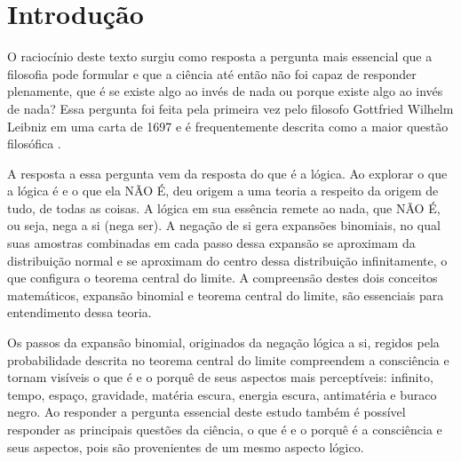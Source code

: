 \section*{Introdução}

O raciocínio deste texto surgiu como resposta a pergunta mais essencial que a filosofia pode formular e que a ciência até então não foi capaz de responder plenamente, que é se existe algo ao invés de nada ou porque existe algo ao invés de nada? 
Essa pergunta foi feita pela primeira vez pelo filosofo Gottfried Wilhelm Leibniz em uma carta de 1697 e é frequentemente descrita como a maior questão filosófica \cite{ leibnizbrasil_origem_das_coisas}.

A resposta a essa pergunta vem da resposta do que é a lógica. Ao explorar o que a lógica é e o que ela NÃO É, deu origem a uma teoria a respeito da origem de tudo, de todas as coisas. A lógica em sua essência remete ao nada, que NÃO É, ou seja, nega a si (nega ser). A negação de si gera expansões binomiais, no qual suas amostras combinadas em cada passo dessa expansão se aproximam da distribuição normal e se aproximam do centro dessa distribuição infinitamente, o que configura o teorema central do limite. A compreensão destes dois conceitos matemáticos, expansão binomial e teorema central do limite, são essenciais para entendimento dessa teoria.

Os passos da expansão binomial, originados da negação lógica a si, regidos pela probabilidade descrita no teorema central do limite compreendem a consciência e tornam visíveis o que é e o porquê de seus aspectos mais perceptíveis: infinito, tempo, espaço, gravidade, matéria escura, energia escura, antimatéria e buraco negro. Ao responder a pergunta essencial deste estudo também é possível responder as principais questões da ciência, o que é e o porquê é a consciência e seus aspectos, pois são provenientes de um mesmo aspecto lógico.


